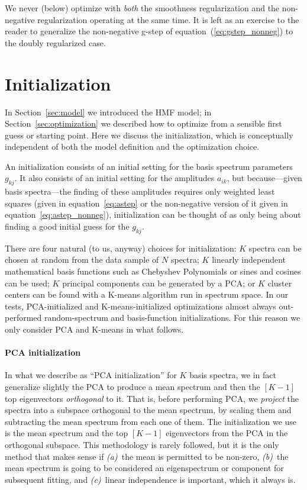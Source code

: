 \documentclass[12pt,preprint]{aastex}
\newcommand{\sectionname}{Section}
\newcommand{\equationname}{equation}
\begin{document}
We never (below) optimize with \emph{both} the smoothness
regularization and the non-negative regularization operating at the
same time.  It is left as an exercise to the reader to generalize the
non-negative g-step of \equationname~(\ref{eq:gstep_nonneg}) to the
doubly regularized case.

\section{Initialization}\label{sec:initialization}

In \sectionname~\ref{sec:model} we introduced the HMF model; in
\sectionname~\ref{sec:optimization} we described how to optimize from
a sensible first guess or starting point.  Here we discuss the
initialization, which is conceptually independent of both the model
definition and the optimization choice.

An initialization consists of an initial setting for the basis
spectrum parameters $g_{kj}$.  It also consists of an initial setting
for the amplitudes $a_{ik}$, but because---given basis spectra---the
finding of these amplitudes requires only weighted least squares
(given in \equationname~\ref{eq:astep} or the non-negative version of
it given in \equationname~\ref{eq:astep_nonneg}), initialization can
be thought of as only being about finding a good initial guess for the
$g_{kj}$.

There are four natural (to us, anyway) choices for initialization: $K$
spectra can be chosen at random from the data sample of $N$ spectra;
$K$ linearly independent mathematical basis functions such as
Chebyshev Polynomials or sines and cosines can be used; $K$ principal
components can be generated by a PCA; or $K$ cluster centers can be
found with a K-means algorithm run in spectrum space.  In our tests,
PCA-initialized and K-means-initialized optimizations almost always
out-performed random-spectrum and basis-function initializations.  For
this reason we only consider PCA and K-means in what follows.

\paragraph{PCA initialization}
In what we describe as ``PCA initialization'' for $K$ basis spectra,
we in fact generalize slightly the PCA to produce a mean spectrum and
then the $[K-1]$ top eigenvectors \emph{orthogonal} to it. 
That is, before performing PCA, we \emph{project} the spectra into a 
subspace orthogonal to the mean spectrum, by scaling them 
and subtracting the mean spectrum from each one of them.
The initialization we use is the mean spectrum
and the top $[K-1]$ eigenvectors from the PCA in the orthogonal
subspace.  This methodology is rarely followed, but it is the only
method that makes sense if \textsl{(a)}~the mean is permitted to be
non-zero, \textsl{(b)}~the mean spectrum is going to be considered an
eigenspectrum or component for subsequent fitting, and
\textsl{(c)}~linear independence is important, which it always is.
\end{document}
